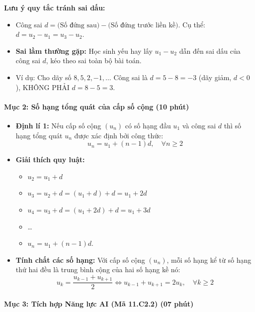 \documentclass[12pt, a4paper]{article}
\begin{document}
\begin{scaffoldbox}
    \textbf{Lưu ý quy tắc tránh sai dấu:}
    \begin{itemize}
        \item Công sai $d = \text{(Số đứng sau)} - \text{(Số đứng trước liền kề)}$. Cụ thể: $d = u_2 - u_1 = u_3 - u_2$.
        \item \textbf{Sai lầm thường gặp:} Học sinh yếu hay lấy $u_1 - u_2$ dẫn đến sai dấu của công sai $d$, kéo theo sai toàn bộ bài toán.
        \item Ví dụ: Cho dãy số $8, 5, 2, -1, \dots$ Công sai là $d = 5 - 8 = -3$ (dãy giảm, $d < 0$), KHÔNG PHẢI $d = 8 - 5 = 3$.
    \end{itemize}
\end{scaffoldbox}


\paragraph{Mục 2: Số hạng tổng quát của cấp số cộng (10 phút)}
\begin{itemize}
    \item \textbf{Định lí 1:} Nếu cấp số cộng $(u_n)$ có số hạng đầu $u_1$ và công sai $d$ thì số hạng tổng quát $u_n$ được xác định bởi công thức:
    $$u_n = u_1 + (n - 1)d, \quad \forall n \ge 2$$
    \item \textbf{Giải thích quy luật:}
    \begin{itemize}
        \item $u_2 = u_1 + d$
        \item $u_3 = u_2 + d = (u_1 + d) + d = u_1 + 2d$
        \item $u_4 = u_3 + d = (u_1 + 2d) + d = u_1 + 3d$
        \item \dots
        \item $u_n = u_1 + (n - 1)d$.
    \end{itemize}
    \item \textbf{Tính chất các số hạng:} Với cấp số cộng $(u_n)$, mỗi số hạng kể từ số hạng thứ hai đều là trung bình cộng của hai số hạng kề nó:
    $$u_k = \dfrac{u_{k-1} + u_{k+1}}{2} \iff u_{k-1} + u_{k+1} = 2u_k, \quad \forall k \ge 2$$
\end{itemize}


\paragraph{Mục 3: Tích hợp Năng lực AI (Mã 11.C2.2) (07 phút)}
\end{document}

